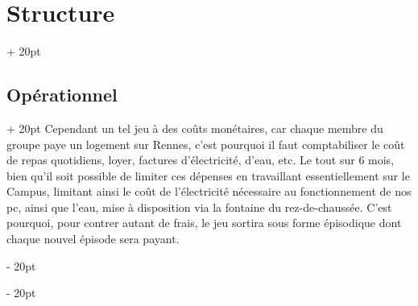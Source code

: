 \documentclass[a4paper, 12pt, twoside]{article}
\newcommand{\ind}[1][20pt]{\advance\leftskip + #1}
\newcommand{\deind}[1][20pt]{\advance\leftskip - #1}
\newenvironment{indt}[2][20pt]{#2 \par \ind[#1]}{\par \deind} %
\begin{document}
\begin{indt}{\section{Structure}}
        \begin{indt}{\subsection{Opérationnel}}
            Cependant un tel jeu à des coûts monétaires, car chaque membre du groupe paye un logement sur Rennes, c'est pourquoi il faut comptabiliser le coût de repas quotidiens, loyer, factures d'électricité, d'eau, etc. Le tout sur 6 mois, bien qu'il soit possible de limiter ces dépenses en travaillant essentiellement sur le Campus, limitant ainsi le coût de l'électricité nécessaire au fonctionnement de nos pc, ainsi que l'eau, mise à disposition via la fontaine du rez-de-chaussée. C'est pourquoi, pour contrer autant de frais, le jeu sortira sous forme épisodique dont chaque nouvel épisode sera payant.
        \end{indt} 
    \end{indt}

    \newpage
\end{document}
